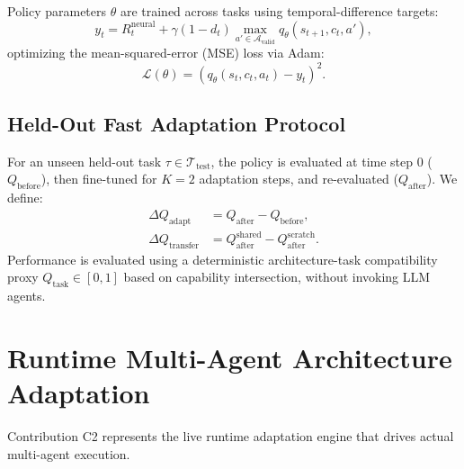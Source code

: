 \documentclass[conference]{IEEEtran}
\begin{document}
Policy parameters $\theta$ are trained across tasks using temporal-difference targets:
\begin{equation}
y_t = R_t^{\mathrm{neural}} + \gamma (1 - d_t) \max_{a' \in \mathcal{A}_{\mathrm{valid}}} q_\theta(s_{t+1}, c_t, a'),
\end{equation}
optimizing the mean-squared-error (MSE) loss via Adam:
\begin{equation}
\mathcal{L}(\theta) = \left(q_\theta(s_t, c_t, a_t) - y_t\right)^2.
\end{equation}

\subsection{Held-Out Fast Adaptation Protocol}
For an unseen held-out task $\tau \in \mathcal{T}_{\mathrm{test}}$, the policy is evaluated at time step 0 ($Q_{\mathrm{before}}$), then fine-tuned for $K = 2$ adaptation steps, and re-evaluated ($Q_{\mathrm{after}}$). We define:
\begin{align}
\Delta Q_{\mathrm{adapt}} &= Q_{\mathrm{after}} - Q_{\mathrm{before}}, \\
\Delta Q_{\mathrm{transfer}} &= Q_{\mathrm{after}}^{\mathrm{shared}} - Q_{\mathrm{after}}^{\mathrm{scratch}}.
\end{align}
Performance is evaluated using a deterministic architecture-task compatibility proxy $Q_{\mathrm{task}} \in [0, 1]$ based on capability intersection, without invoking LLM agents.

\section{Runtime Multi-Agent Architecture Adaptation}
\label{sec:runtime_q_learning}

Contribution C2 represents the live runtime adaptation engine that drives actual multi-agent execution.
\end{document}
